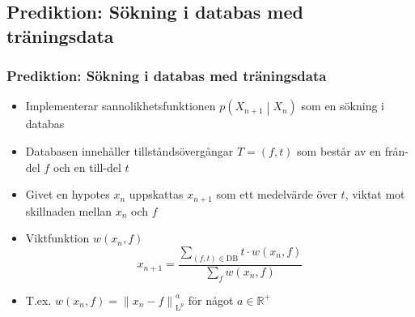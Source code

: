 \documentclass[]{beamer}
\renewcommand{\ae}{\"{a}}
\renewcommand{\oe}{\"{o}}
\newcommand{\prob}[1]{p\left(#1\right)}
\newcommand{\cprob}[2]{\prob{\left. #1 \middle\vert #2 \right.}}
\newcommand{\cprobnext}[1]{\cprob{#1_{n+1}}{#1_n}}
\newcommand{\norm}[1]{\left\|#1\right\|}
\newcommand{\Lp}[1]{\mathrm{L}^{#1}}
\newcommand{\bbset}[1]{\mathbb{#1}}
\newcommand{\RP}{\bbset{R}^+}
\begin{document}
\subsection{Prediktion: S\oe kning i databas med tr\ae ningsdata}
\begin{frame}
  \frametitle{Prediktion: S\oe kning i databas med tr\ae ningsdata}
  \begin{itemize}
  \item Implementerar sannolikhetsfunktionen $\cprobnext{X}$ som en s\oe kning i databas
  \item Databasen inneh\aa ller tillst\aa nds\oe verg\aa ngar $T = (f, t)$ som best\aa r av en fr\aa n-del $f$ och en till-del $t$
  \item Givet en hypotes $x_n$ uppskattas $x_{n+1}$ som ett medelv\ae rde \oe ver $t$, viktat mot skillnaden mellan $x_n$ och $f$
  \item Viktfunktion $w(x_n, f)$
    \begin{equation*}
      x_{n+1} = \frac{\sum\limits_{(f, t) \in \mathrm{DB}} t \cdot w(x_n, f)}{\sum\limits_f w(x_n, f)}
    \end{equation*}
  \item T.ex. $w(x_n, f) = \norm{x_n - f}_{\Lp{p}}^a$ f\oe r n\aa got $a\in \RP$
  \end{itemize}
\end{frame}
\end{document}
